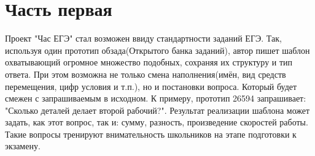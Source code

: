 

\section{Часть первая}
Проект "Час ЕГЭ" стал возможен ввиду стандартности заданий ЕГЭ.
Так, используя один прототип обзада(Открытого банка заданий), автор пишет шаблон охватывающий огромное множество подобных, сохраняя их структуру и тип ответа.
При этом возможна не только смена наполнения(имён, вид средств перемещения, цифр условия и т.п.), но и постановки вопроса.
Который будет смежен с запрашиваемым в исходном.
К примеру, прототип 26594 запрашивает:
"Сколько деталей делает второй рабочий?".
Результат реализации шаблона может задать, как этот вопрос, так и: сумму, разность, произведение скоростей работы.
Такие вопросы тренируют внимательность школьников на этапе подготовки к экзамену.

